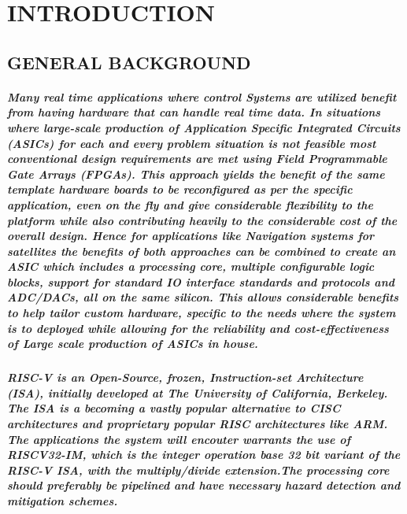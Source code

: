 \documentclass[12pt,a4paper]{report}
\begin{document}
\chapter{\large INTRODUCTION}
\section{\small\MakeUppercase{General Background}}
\paragraph{\textrm{\textmd{Many real time applications where control Systems are utilized benefit from having hardware that can handle real time data. In situations where large-scale production of Application Specific Integrated Circuits (ASICs) for each and every problem situation is not feasible most conventional design requirements are met using Field Programmable Gate Arrays (FPGAs). This approach yields the benefit of the same template hardware boards to be reconfigured as per the specific application, even on the fly and give considerable flexibility to the platform while also contributing heavily to the considerable cost of the overall design. Hence for applications like Navigation systems for satellites the benefits of both approaches can be combined to create an ASIC which includes a processing core, multiple configurable logic blocks, support for standard IO interface standards and protocols and ADC/DACs, all on the same silicon. This allows considerable benefits to help tailor custom hardware, specific to the needs where the system is to deployed while allowing for the reliability and cost-effectiveness of Large scale production of ASICs in house.}}}
\paragraph{\textrm{\textmd{RISC-V is an Open-Source, frozen, Instruction-set Architecture (ISA), initially developed at The University of California, Berkeley. The ISA is a becoming a vastly popular alternative to CISC architectures and proprietary popular RISC architectures like ARM. The applications the system will encouter warrants the use of RISCV32-IM, which is the integer operation base 32 bit variant of the RISC-V ISA, with the multiply/divide extension.The processing core should preferably be pipelined and have necessary hazard detection and mitigation schemes.}}}
\end{document}
